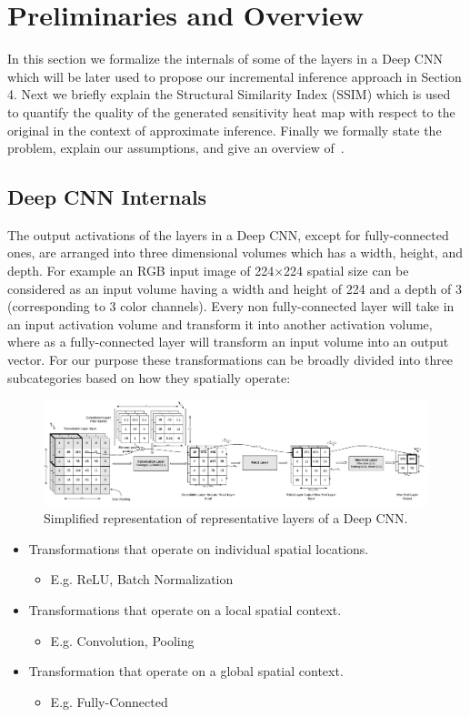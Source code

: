 \section{Preliminaries and Overview}
In this section we formalize the internals of some of the layers in a Deep CNN which will be later used to propose our incremental inference approach in Section 4. Next we briefly explain the Structural Similarity Index (SSIM) which is used to quantify the quality of the generated sensitivity heat map with respect to the original in the context of approximate inference. Finally we formally state the problem, explain our assumptions, and give an overview of~\system.

\subsection{Deep CNN Internals}
The output activations of the layers in a Deep CNN, except for fully-connected ones, are arranged into three dimensional volumes which has a width, height, and depth.
For example an RGB input image of 224$\times$224 spatial size can be considered as an input volume having a width and height of 224 and a depth of 3 (corresponding to 3 color channels). Every non fully-connected layer will take in an input activation volume and transform it into another activation volume, where as a fully-connected layer will transform an input volume into an output vector. For our purpose these transformations can be broadly divided into three subcategories based on how they spatially operate:

\begin{figure}[t]
\includegraphics[width=\textwidth]{images/cnn_simplified}
\caption{Simplified representation of representative layers of a Deep CNN.}

\end{figure}

\begin{itemize}
	\item Transformations that operate on individual spatial locations.
	\begin{itemize}
	 \item E.g. ReLU, Batch Normalization
	\end{itemize}
	\item Transformations that operate on a local spatial context.
	\begin{itemize}
	 \item E.g. Convolution, Pooling
	\end{itemize}
	\item Transformation that operate on a global spatial context.
	\begin{itemize}
	 \item E.g. Fully-Connected
	\end{itemize}
\end{itemize}

